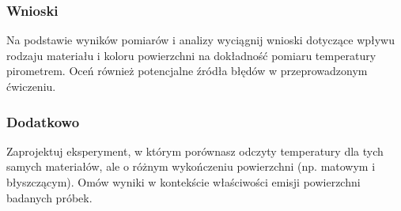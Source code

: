 \subsubsection*{Wnioski}
Na podstawie wyników pomiarów i analizy wyciągnij wnioski dotyczące wpływu rodzaju materiału i koloru powierzchni na dokładność pomiaru temperatury pirometrem. Oceń również potencjalne źródła błędów w przeprowadzonym ćwiczeniu.

\subsubsection*{Dodatkowo}
Zaprojektuj eksperyment, w którym porównasz odczyty temperatury dla tych samych materiałów, ale o różnym wykończeniu powierzchni (np. matowym i błyszczącym). Omów wyniki w kontekście właściwości emisji powierzchni badanych próbek.